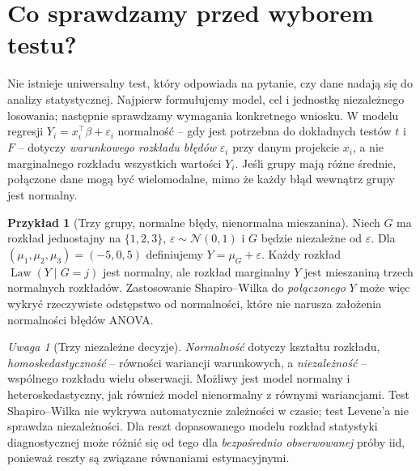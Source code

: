 \documentclass[11pt,a4paper,oneside]{report}
\numberwithin{equation}{chapter}
\theoremstyle{plain}
\theoremstyle{definition}
\newtheorem{przyklad}{Przykład}[chapter]
\theoremstyle{remark}
\newtheorem{uwaga}{Uwaga}[chapter]
\newcommand{\Law}{\operatorname{Law}}
\newcommand{\Normal}{\mathcal N}
\begin{document}
\section{Co sprawdzamy przed wyborem testu?}
Nie istnieje uniwersalny test, który odpowiada na pytanie, czy dane nadają się do analizy statystycznej. Najpierw formułujemy model, cel i jednostkę niezależnego losowania; następnie sprawdzamy wymagania konkretnego wniosku. W modelu regresji $Y_i=x_i^\top\beta+\varepsilon_i$ normalność -- gdy jest potrzebna do dokładnych testów $t$ i $F$ -- dotyczy \emph{warunkowego rozkładu błędów} $\varepsilon_i$ przy danym projekcie $x_i$, a nie marginalnego rozkładu wszystkich wartości $Y_i$. Jeśli grupy mają różne średnie, połączone dane mogą być wielomodalne, mimo że każdy błąd wewnątrz grupy jest normalny.

\begin{przyklad}[Trzy grupy, normalne błędy, nienormalna mieszanina]
Niech $G$ ma rozkład jednostajny na $\{1,2,3\}$, $\varepsilon\sim\Normal(0,1)$ i $G$ będzie niezależne od $\varepsilon$. Dla $(\mu_1,\mu_2,\mu_3)=(-5,0,5)$ definiujemy $Y=\mu_G+\varepsilon$. Każdy rozkład $\Law(Y\mid G=j)$ jest normalny, ale rozkład marginalny $Y$ jest mieszaniną trzech normalnych rozkładów. Zastosowanie Shapiro--Wilka do \emph{połączonego} $Y$ może więc wykryć rzeczywiste odstępstwo od normalności, które nie narusza założenia normalności błędów ANOVA.
\end{przyklad}

\begin{uwaga}[Trzy niezależne decyzje]
\emph{Normalność} dotyczy kształtu rozkładu, \emph{homoskedastyczność} -- równości wariancji warunkowych, a \emph{niezależność} -- wspólnego rozkładu wielu obserwacji. Możliwy jest model normalny i heteroskedastyczny, jak również model nienormalny z równymi wariancjami. Test Shapiro--Wilka nie wykrywa automatycznie zależności w czasie; test Levene'a nie sprawdza niezależności. Dla reszt dopasowanego modelu rozkład statystyki diagnostycznej może różnić się od tego dla \emph{bezpośrednio obserwowanej} próby iid, ponieważ reszty są związane równaniami estymacyjnymi.
\end{uwaga}
\end{document}

